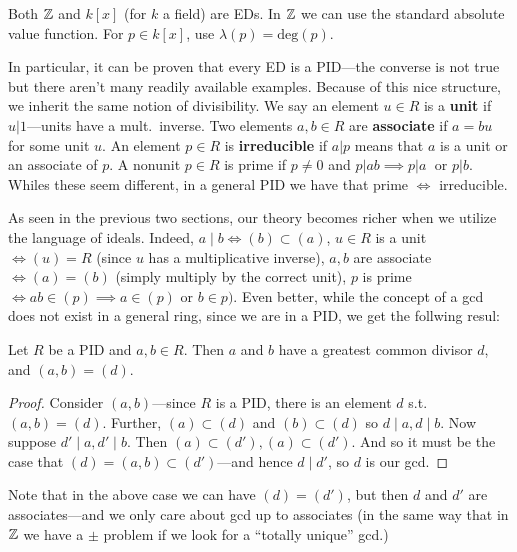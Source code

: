 Both \(\mathbb{Z} \) and \(k[x]\) (for \(k\) a field) are EDs. In \(\mathbb{Z} \) we can use
the standard absolute value function. For \(p \in k[x]\), use \(\lambda(p)=\textrm{deg}(p)\).

In particular, it can be proven that every ED is a PID---the converse is not
true but there aren't many readily available examples. Because of this nice
structure, we inherit the same notion of divisibility. We say an element
\(u \in R\) is a \textbf{unit} if \(u | 1\)---\ie units have a mult.\ inverse. Two
elements \(a,b \in R\) are \textbf{associate} if \(a=bu\) for some unit \(u\).
An element \(p \in R\) is \textbf{irreducible} if \(a|p\) means that \(a\) is a
unit or an associate of \(p\). A nonunit \(p \in R\) is prime if \(p \neq 0\)
and \(p|ab \implies p|a\; \textrm{ or } p|b\). Whiles these seem different, in a
general PID we have that prime \(\Leftrightarrow\) irreducible.

As seen in the previous two sections, our theory becomes richer when we utilize
the language of ideals. Indeed, \(a\mid b \Leftrightarrow (b) \subset (a)\),
\(u \in R\) is a unit \(\Leftrightarrow (u) = R\) (since \(u\) has a
multiplicative inverse), \(a,b\) are associate \(\Leftrightarrow (a)=(b)\)
(simply multiply by the correct unit), \(p\) is prime
\(\Leftrightarrow ab \in (p) \implies a \in (p) \textrm{ or } b \in p )\).
Even better, while the concept of a gcd does not exist in a general ring, since
we are in a PID, we get the follwing resul:

\begin{prop}
  Let \(R\) be a PID and \(a,b \in R\). Then \(a\) and \(b\) have a greatest
  common divisor \(d\), and \((a,b) = (d)\).
\end{prop}

\begin{proof}
  Consider \((a,b)\)---since \(R\) is a PID, there is an element \(d\) s.t.\
  \((a,b)=(d)\). Further, \((a) \subset(d)\) and \((b)\subset(d)\) so
  \(d \mid a, d \mid b\). Now suppose \(d'\mid a, d'\mid b\). Then
  \((a) \subset(d'), (a) \subset(d')\). And so it must be the case that
  \((d) = (a,b) \subset(d')\)---and hence \(d \mid d'\), so \(d\) is our gcd.
\end{proof}

\begin{remark}
  Note that in the above case we can have \((d)=(d')\), but then \(d\) and
  \(d'\) are associates---and we only care about gcd up to associates (in the
  same way that in \(\mathbb{Z} \) we have a \(\pm\) problem if we look for a ``totally
  unique'' gcd.)
\end{remark}

